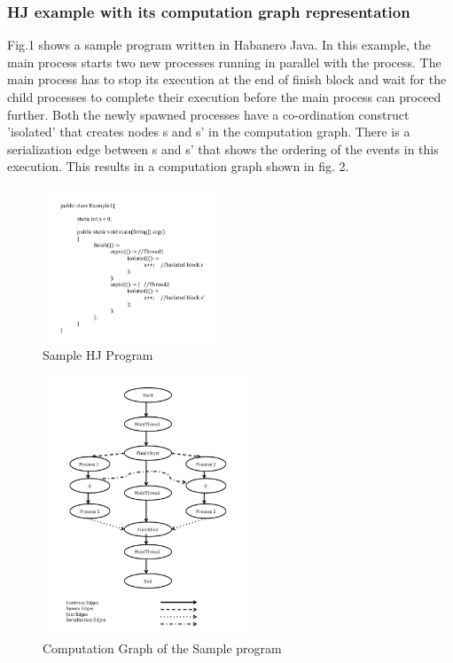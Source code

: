 \subsubsection{HJ example with its computation graph representation}
Fig.1 shows a sample program written in Habanero Java. In this example, the main process starts two new processes running in parallel with the process. The main process has to stop its execution at the end of finish block and wait for the child processes to complete their execution before the main process can proceed further. Both the newly spawned processes have a co-ordination construct 'isolated' that creates nodes s and s' in the computation graph. There is a serialization edge between s and s' that shows the ordering of the events in this execution. This results in a computation graph shown in fig. 2. 

\begin{figure}[H]
  \centering
    \includegraphics[width=0.47\textwidth]{../figs/Fig1.jpg}
     \caption{Sample HJ Program}
\end{figure}
\begin{figure}[H]
  \centering
    \includegraphics[width=0.55\textwidth]{../figs/Fig2.jpg}
    \caption{Computation Graph of the Sample program}
\end{figure}

